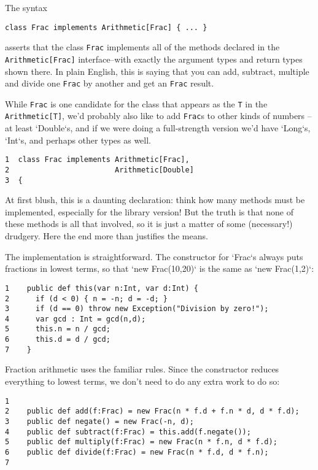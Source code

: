 The syntax 
\begin{verbatim}
class Frac implements Arithmetic[Frac] { ... }
\end{verbatim}
asserts that the class {\tt Frac} implements all of the methods 
declared in the {\tt Arith\-me\-tic[Frac]} interface--with exactly the 
argument types and return types shown there.
In plain English, this is saying that you can add, subtract, multiple and divide one
{\tt Frac} by another and get an {\tt Frac} result.


While {\tt Frac} is one candidate for the class that
appears as the {\tt T} in the {\tt Arithmetic[T]}, we'd probably also like to
add {\tt Frac}s to other kinds of numbers -- at least \xcd`Double`s, and if we
were doing a full-strength version we'd have \xcd`Long`s, \xcd`Int`s, and
perhaps other types as well.  


\begin{verbatim}
1  class Frac implements Arithmetic[Frac], 
2                        Arithmetic[Double] 
3  {
\end{verbatim}



At first blush, this is a daunting declaration: think how many methods must be
implemented, especially for the library version!
But the truth is that none of these methods is all that involved, so it is just a matter of
some (necessary!) drudgery.  Here the end more than justifies the means.

The implementation is straightforward.  The constructor for
\xcd`Frac`s always puts fractions in lowest terms, so that 
\xcd`new Frac(10,20)` is the same as  \xcd`new Frac(1,2)`: 

\begin{verbatim}
1    public def this(var n:Int, var d:Int) {
2      if (d < 0) { n = -n; d = -d; }
3      if (d == 0) throw new Exception("Division by zero!");
4      var gcd : Int = gcd(n,d);
5      this.n = n / gcd;
6      this.d = d / gcd;
7    }
\end{verbatim}

Fraction arithmetic uses the familiar rules.  Since the constructor reduces
everything to lowest terms, we don't need to do any extra work to do so: 

\begin{verbatim}
1    
2    public def add(f:Frac) = new Frac(n * f.d + f.n * d, d * f.d);
3    public def negate() = new Frac(-n, d);
4    public def subtract(f:Frac) = this.add(f.negate());
5    public def multiply(f:Frac) = new Frac(n * f.n, d * f.d);
6    public def divide(f:Frac) = new Frac(n * f.d, d * f.n);  
7    
\end{verbatim}

